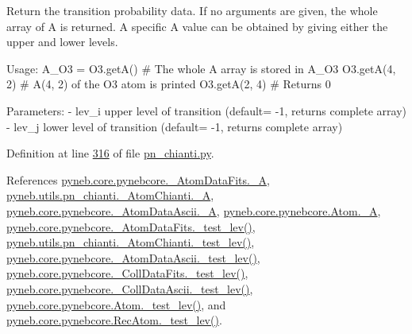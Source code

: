 \begin{DoxyVerb}Return the transition probability data. 
If no arguments are given, the whole array of A is returned.
A specific A value can be obtained by giving either the upper and lower levels.
    
Usage:
    A_O3 = O3.getA()          # The whole A array is stored in A_O3
    O3.getA(4, 2)      # A(4, 2) of the O3 atom is printed
    O3.getA(2, 4)      # Returns 0

Parameters:
    - lev_i  upper level of transition (default= -1, returns complete array)
    - lev_j  lower level of transition (default= -1, returns complete array)\end{DoxyVerb}
 

Definition at line \hyperlink{pn__chianti_8py_source_l00316}{316} of file \hyperlink{pn__chianti_8py_source}{pn\-\_\-chianti.\-py}.



References \hyperlink{pynebcore_8py_source_l00100}{pyneb.\-core.\-pynebcore.\-\_\-\-Atom\-Data\-Fits.\-\_\-\-A}, \hyperlink{pn__chianti_8py_source_l00287}{pyneb.\-utils.\-pn\-\_\-chianti.\-\_\-\-Atom\-Chianti.\-\_\-\-A}, \hyperlink{pynebcore_8py_source_l00415}{pyneb.\-core.\-pynebcore.\-\_\-\-Atom\-Data\-Ascii.\-\_\-\-A}, \hyperlink{pynebcore_8py_source_l01319}{pyneb.\-core.\-pynebcore.\-Atom.\-\_\-\-A}, \hyperlink{pynebcore_8py_source_l00178}{pyneb.\-core.\-pynebcore.\-\_\-\-Atom\-Data\-Fits.\-\_\-test\-\_\-lev()}, \hyperlink{pn__chianti_8py_source_l00304}{pyneb.\-utils.\-pn\-\_\-chianti.\-\_\-\-Atom\-Chianti.\-\_\-test\-\_\-lev()}, \hyperlink{pynebcore_8py_source_l00447}{pyneb.\-core.\-pynebcore.\-\_\-\-Atom\-Data\-Ascii.\-\_\-test\-\_\-lev()}, \hyperlink{pynebcore_8py_source_l00677}{pyneb.\-core.\-pynebcore.\-\_\-\-Coll\-Data\-Fits.\-\_\-test\-\_\-lev()}, \hyperlink{pynebcore_8py_source_l01045}{pyneb.\-core.\-pynebcore.\-\_\-\-Coll\-Data\-Ascii.\-\_\-test\-\_\-lev()}, \hyperlink{pynebcore_8py_source_l01525}{pyneb.\-core.\-pynebcore.\-Atom.\-\_\-test\-\_\-lev()}, and \hyperlink{pynebcore_8py_source_l02672}{pyneb.\-core.\-pynebcore.\-Rec\-Atom.\-\_\-test\-\_\-lev()}.


